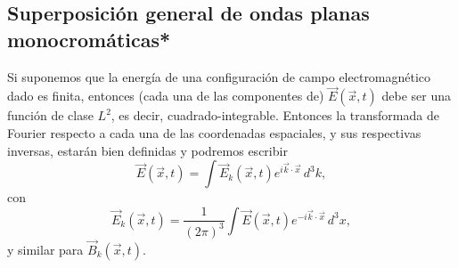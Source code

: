 \subsection{Superposición general de ondas planas monocromáticas*}
Si suponemos que la energía de una configuración de campo electromagnético dado es finita, entonces (cada una de las componentes de) $\vec{E}(\vec{x},t)$ debe ser una función de clase $L^2$, es decir, cuadrado-integrable. Entonces la transformada de Fourier respecto a cada una de las coordenadas espaciales, y sus respectivas inversas, estarán bien definidas y podremos escribir
\begin{equation}
\vec{E}(\vec{x},t)=\int\vec{E}_k(\vec{x},t)e^{i\vec{k}\cdot\vec{x}}\,d^3k,
\end{equation}
con
\begin{equation}
\vec{E}_k(\vec{x},t)=\frac{1}{(2\pi)^3}\int\vec{E}(\vec{x},t)e^{-i\vec{k}\cdot\vec{x}}\,d^3x,
\end{equation}
y similar para $\vec{B}_k(\vec{x},t)$.

